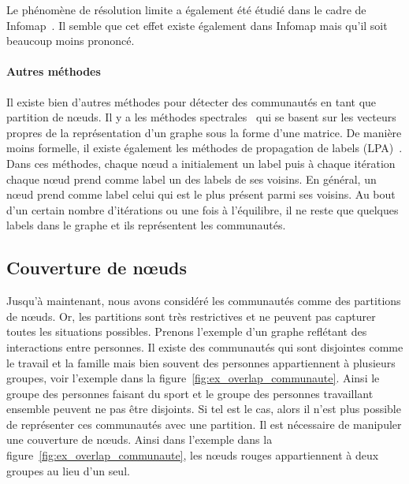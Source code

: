 Le phénomène de résolution limite a également été étudié dans le cadre de Infomap~\cite{Kawamoto2015}.
Il semble que cet effet existe également dans Infomap mais qu'il soit beaucoup moins prononcé.

\paragraph{Autres méthodes}
Il existe bien d'autres méthodes pour détecter des communautés en tant que partition de n\oe{}uds.
Il y a les méthodes spectrales~\cite{Donetti2004,Mitrovic2009} qui se basent sur les vecteurs propres de la représentation d'un graphe sous la forme d'une matrice.
De manière moins formelle, il existe également les méthodes de propagation de labels (LPA)~\cite{Raghavan2007a,Li2014c}.
Dans ces méthodes, chaque n\oe{}ud a initialement un label puis à chaque itération chaque n\oe{}ud prend comme label un des labels de ses voisins.
En général, un n\oe{}ud prend comme label celui qui est le plus présent parmi ses voisins.
Au bout d'un certain nombre d'itérations ou une fois à l'équilibre, il ne reste que quelques labels dans le graphe et ils représentent les communautés.



\subsection{Couverture de n\oe{}uds}
\label{subsec:cover}
Jusqu'à maintenant, nous avons considéré les communautés comme des partitions de n\oe{}uds.
Or, les partitions sont très restrictives et ne peuvent pas capturer toutes les situations possibles.
Prenons l'exemple d'un graphe reflétant des interactions entre personnes.
Il existe des communautés qui sont disjointes comme le travail et la famille mais bien souvent des personnes appartiennent à plusieurs groupes, voir l'exemple dans la figure~\ref{fig:ex_overlap_communaute}.
Ainsi le groupe des personnes faisant du sport et le groupe des personnes travaillant ensemble peuvent ne pas être disjoints.
Si tel est le cas, alors il n'est plus possible de représenter ces communautés avec une partition.
Il est nécessaire de manipuler une couverture de n\oe{}uds.
Ainsi dans l'exemple dans la figure~\ref{fig:ex_overlap_communaute}, les n\oe{}uds rouges appartiennent à deux groupes au lieu d'un seul.

